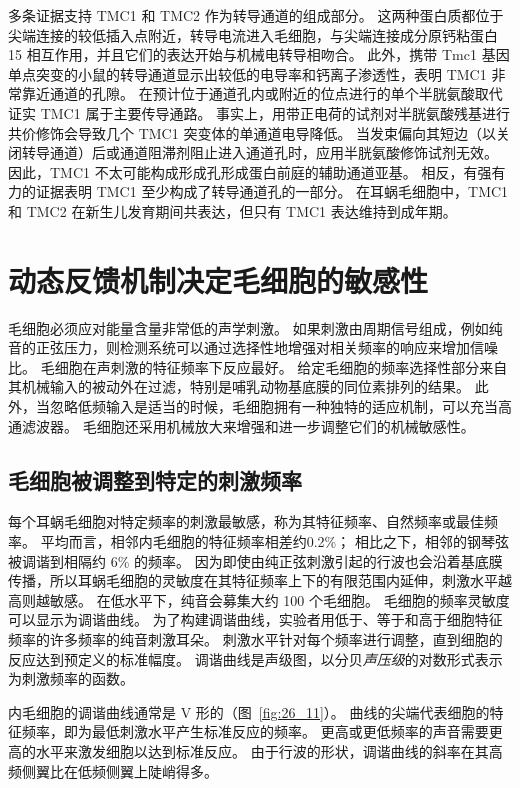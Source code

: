 多条证据支持 TMC1 和 TMC2 作为转导通道的组成部分。
这两种蛋白质都位于尖端连接的较低插入点附近，转导电流进入毛细胞，与尖端连接成分原钙粘蛋白 15 相互作用，并且它们的表达开始与机械电转导相吻合。
此外，携带 Tmc1 基因单点突变的小鼠的转导通道显示出较低的电导率和钙离子渗透性，表明 TMC1 非常靠近通道的孔隙。
在预计位于通道孔内或附近的位点进行的单个半胱氨酸取代证实 TMC1 属于主要传导通路。
事实上，用带正电荷的试剂对半胱氨酸残基进行共价修饰会导致几个 TMC1 突变体的单通道电导降低。
当发束偏向其短边（以关闭转导通道）后或通道阻滞剂阻止进入通道孔时，应用半胱氨酸修饰试剂无效。
因此，TMC1 不太可能构成形成孔形成蛋白前庭的辅助通道亚基。
相反，有强有力的证据表明 TMC1 至少构成了转导通道孔的一部分。
在耳蜗毛细胞中，TMC1 和 TMC2 在新生儿发育期间共表达，但只有 TMC1 表达维持到成年期。



\section{动态反馈机制决定毛细胞的敏感性}

毛细胞必须应对能量含量非常低的声学刺激。
如果刺激由周期信号组成，例如纯音的正弦压力，则检测系统可以通过选择性地增强对相关频率的响应来增加信噪比。
毛细胞在声刺激的特征频率下反应最好。
给定毛细胞的频率选择性部分来自其机械输入的被动外在过滤，特别是哺乳动物基底膜的同位素排列的结果。
此外，当忽略低频输入是适当的时候，毛细胞拥有一种独特的适应机制，可以充当高通滤波器。
毛细胞还采用机械放大来增强和进一步调整它们的机械敏感性。



\subsection{毛细胞被调整到特定的刺激频率}

每个耳蜗毛细胞对特定频率的刺激最敏感，称为其特征频率、自然频率或最佳频率。
平均而言，相邻内毛细胞的特征频率相差约0.2\%；
相比之下，相邻的钢琴弦被调谐到相隔约 6\% 的频率。 
因为即使由纯正弦刺激引起的行波也会沿着基底膜传播，所以耳蜗毛细胞的灵敏度在其特征频率上下的有限范围内延伸，刺激水平越高则越敏感。
在低水平下，纯音会募集大约 100 个毛细胞。
毛细胞的频率灵敏度可以显示为调谐曲线。
为了构建调谐曲线，实验者用低于、等于和高于细胞特征频率的许多频率的纯音刺激耳朵。
刺激水平针对每个频率进行调整，直到细胞的反应达到预定义的标准幅度。
调谐曲线是声级图，以分贝\textit{声压级}的对数形式表示为刺激频率的函数。


内毛细胞的调谐曲线通常是 V 形的（图~\ref{fig:26_11}）。
曲线的尖端代表细胞的特征频率，即为最低刺激水平产生标准反应的频率。
更高或更低频率的声音需要更高的水平来激发细胞以达到标准反应。
由于行波的形状，调谐曲线的斜率在其高频侧翼比在低频侧翼上陡峭得多。


